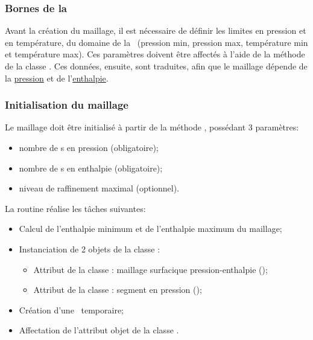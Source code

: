 	 \subsubsection{Bornes de la \bdd}\label{bornes}
	 
	 Avant la création du maillage, il est nécessaire de définir les limites en pression et en température, du domaine de la \bdd\ 
	 (pression min, pression max, température min et température max). 
	 Ces paramètres doivent être affectés à l'aide de la méthode  de la classe \IGEN.
	 Ces données, ensuite, sont traduites, afin que le maillage dépende de la \underline{pression} et de l'\underline{enthalpie}. 
	 
	 	 
	 
	 \subsubsection{Initialisation du maillage}\label{initm}
	 
	 Le maillage doit être initialisé à partir de la méthode , possédant 3 paramètres:
	 \vspace{0.3cm}
	 \begin{itemize}
	  \item nombre de \n s en pression (obligatoire);
	  \item nombre de \n s en enthalpie (obligatoire);
	  \item niveau de raffinement maximal (optionnel).
	 \end{itemize}
	 \smallbreak
	 \vspace{0.5cm}
	 La routine  réalise les tâches suivantes:
	 \vspace{0.3cm}
	 \begin{itemize}
	  \item Calcul de l'enthalpie minimum et de l'enthalpie maximum du maillage;
	  \item Instanciation de 2 objets de la classe \MESH:
	  \begin{itemize}
	    \item[\ding{213}]Attribut  de la classe \IGEN: maillage surfacique pression-enthalpie (\pph);
	    \item[\ding{213}]Attribut \Cpp{mesh\_p}  de la classe \IGEN: segment en pression (\sgp);
	  \end{itemize}
	  \item Création d'une \bdd\ temporaire;
	  \item Affectation de l'attribut  objet de la classe \EOS.
	 \end{itemize}
      
